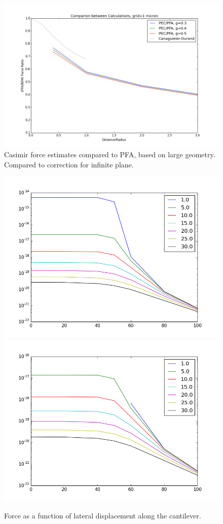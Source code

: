 \documentclass[11pt]{article}
\begin{document}
\begin{figure}[h]
\centering
\includegraphics[width=7in]{pfa_v_pec_best}
\caption{Casimir force estimates compared to PFA, based on large geometry. Compared to correction for infinite plane.}\label{fig:geometricbest}
\end{figure}

\begin{figure}[h]
\centering
\includegraphics[width=5in]{lateral_force}
\includegraphics[width=5in]{lateral_force_finite}
\caption{Force as a function of lateral displacement along the cantilever.}\label{fig:lat}
\end{figure}
\end{document}
